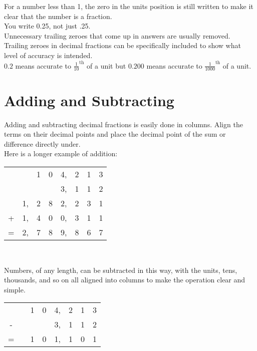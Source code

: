 \documentclass{article}
\begin{document}
For a number less than 1, the zero in the units position is still written to make it clear that the number is a fraction.\\

You write 0.25, not just .25.\\

Unnecessary trailing zeroes that come up in answers are usually removed.\\

Trailing zeroes in decimal fractions can be specifically included to show what level of accuracy is intended.\\

$0.2$ means accurate to $\frac{1}{10}^{\textrm{th}}$ of a unit but $0.200$ means accurate to $\frac{1}{1000}^{\textrm{th}}$ of a unit.

\section{Adding and Subtracting}
Adding and subtracting decimal fractions is easily done in columns. Align the terms on their decimal points and place the decimal point of the sum or difference directly under.\\

Here is a longer example of addition:\\

\begin{center}
\begin{tabular}{c@{\,}c@{\,}c@{\,}c@{\,}c@{\,}c@{\,}c@{\,}c@{\,}}
 & &1&0&4,&2&1&3\\
 & & & &3,&1&1&2\\
 &1,&2&8&2,&2&3&1\\
+&1,&4&0&0,&3&1&1\\
\hline
=&2,&7&8&9,&8&6&7\\
\hline
\hline
\end{tabular}\\
\end{center}

Numbers, of any length, can be subtracted in this way, with the units, tens, thousands, and so on all aligned into columns to make the operation clear and simple.

\begin{center}
\begin{tabular}{c@{\,}c@{\,}c@{\,}c@{\,}c@{\,}c@{\,}c@{\,}c@{\,}}
  & &1&0&4,&2&1&3\\
 -& & & &3,&1&1&2\\
\hline
= & &1&0&1,&1&0&1\\
\hline
\hline
\end{tabular}\\
\end{center}
\end{document}

